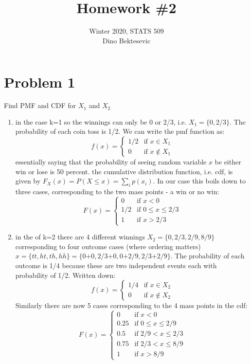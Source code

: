 \documentclass{article}
\date{{}}
\newcommand{\1}{\mathbf{1}}
\begin{document}
\title{Homework \#2}
\author{\normalsize{Winter 2020, STATS 509}\\
\normalsize{Dino Bektesevic}}
\maketitle

\section*{Problem 1}
Find PMF and CDF for $X_1$ and $X_2$
\begin{enumerate}
	\item in the case k=1 so the winnings can only be 0 or 2/3, i.e. $X_1=\{0, 2/3\}$. The probability of each coin toss is 1/2. We can write the pmf function as:
	$$f(x) = \begin{cases} 
	        1/2 &\mbox{if } x \in X_1 \\
            0 & \mbox{if } x \notin X_1 
        \end{cases} 
    $$
    essentially saying that the probability of seeing random variable $x$ be either win or lose is 50 percent. the cumulative distribution function, i.e. cdf, is given by $F_X(x) = P(X\leq x) = \sum_i p(x_i)$. In our case this boils down to three cases, corresponding to the two mass points - a win or no win:
	$$F(x) = \begin{cases} 
	        0 &\mbox{if } x < 0 \\
	        1/2 &\mbox{if } 0 \leq x \leq 2/3 \\
            1 & \mbox{if } x > 2/3 
        \end{cases} 
    $$

    \item in the of k=2 there are 4 different winnings $X_2=\{0, 2/3, 2/9, 8/9\}$ corresponding to four outcome cases (where ordering matters) $x=\{tt, ht, th, hh\} = \{\mbox{0+0}, \mbox{2/3+0}, \mbox{0+2/9}, \mbox{2/3+2/9}\}$. The probability of each outcome is 1/4 because these are two independent events each with probability of 1/2. Written down:
    $$f(x) = \begin{cases} 
	        1/4 &\mbox{if } x \in X_2 \\
            0 & \mbox{if } x \notin X_2 
        \end{cases} 
    $$
	Similarly there are now 5 cases corresponding to the 4 mass points in the cdf:
	$$F(x) = \begin{cases} 
	        0 &\mbox{if } x < 0 \\
	        0.25 &\mbox{if } 0\leq x \leq 2/9 \\
            0.5  & \mbox{if } 2/9 < x \leq 2/3 \\
            0.75 & \mbox{if } 2/3 < x \leq 8/9 \\
            1 & \mbox{if } x > 8/9
        \end{cases} 
    $$
	

\end{enumerate}
\end{document}

